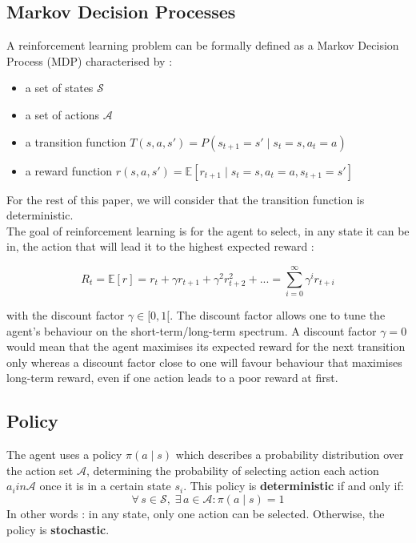\subsection{Markov Decision Processes}
A reinforcement learning problem can be formally defined as a Markov 
Decision Process (MDP)  characterised by :
\begin{itemize}
	\item a set of states $\mathcal{S}$
	\item a set of actions $\mathcal{A}$
	\item a transition function 
		$T(s, a, s') = P(s_{t+1} = s' \mid s_t = s, a_t = a)$
	\item a reward function 
		$r(s, a, s') = \mathbb{E}
		 [r_{t+1} \mid s_t = s, a_t = a, s_{t+1} = s']$
\end{itemize}
For the rest of this paper, we will consider that the transition function is
deterministic.\\

The goal of reinforcement learning is for the agent to select, in any state it
can be in, the action that will lead it to the highest expected reward :

\begin{equation}
\label{eq:discounted_reward}
R_t = \mathbb{E}[r] = r_t + \gamma r_{t+1} + \gamma^2 r_{t+2}^2 + ... =
 \sum\limits_{i=0}^\infty \gamma^i r_{t+i}
\end{equation}

\noindent with the discount factor  $\gamma \in [0, 1[$.
The discount factor allows one to tune the agent's behaviour on the
short-term/long-term spectrum. A discount factor $\gamma=0$ would mean that the
agent maximises its expected reward for the next transition only whereas a
discount factor close to one will favour behaviour that maximises long-term
reward, even if one action leads to a poor reward at first.\\

\subsection{Policy}
The agent uses a policy $\pi(a \mid s)$ which describes a probability
distribution over the action set $\mathcal{A}$, determining the probability of
selecting action each action $a_i in \mathcal{A}$ once it is
in a certain state $s_i$. This policy is \textbf{deterministic} if and only if:
\begin{equation}
\forall\, s \in \mathcal{S},\; \exists\, a \in \mathcal{A} : \pi(a \mid s) = 1
\end{equation}
\noindent In other words : in any state, only one action can be selected.
Otherwise, the policy is \textbf{stochastic}.

